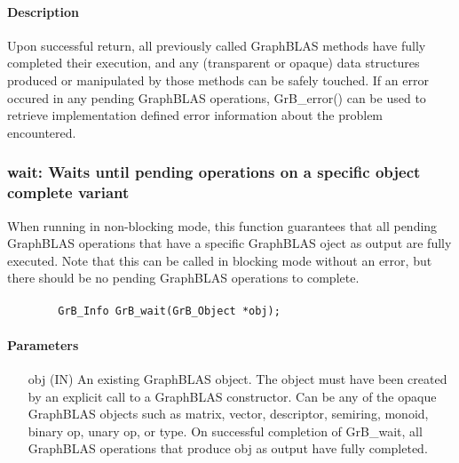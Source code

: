 \paragraph{Description}

Upon successful return, all previously called GraphBLAS methods have fully
completed their execution, and any (transparent or opaque) data structures
produced or manipulated by those methods can be safely touched.  If an
error occured in any pending GraphBLAS operations, {\sf GrB\_error()}
can be used to retrieve implementation defined error information about
the problem encountered.

\subsubsection{{\sf wait}: Waits until pending operations on a specific object complete variant}
\label{Sec:waitOne}

When running in non-blocking mode, this function guarantees that all
pending GraphBLAS operations that have a specific GraphBLAS oject as
output are fully executed.  Note that this can be called in blocking mode
without an error, but there should be no pending GraphBLAS operations
to complete.

\paragraph{\syntax}

\begin{verbatim}
        GrB_Info GrB_wait(GrB_Object *obj);
\end{verbatim}

\paragraph{Parameters}

\begin{itemize}[leftmargin=1.1in]
        \item[{\sf obj}] ({\sf IN}) An existing GraphBLAS object.
        The object must have been created by an explicit call to a
        GraphBLAS constructor.  Can be any of the opaque GraphBLAS
        objects such as matrix, vector, descriptor, semiring, monoid,
        binary op, unary op, or type. On successful completion of {\sf
        GrB\_wait}, all GraphBLAS operations that produce {\sf obj}
        as output have fully completed.
\end{itemize}

